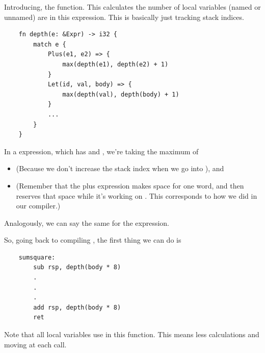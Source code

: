 \bigskip 

Introducing, the  function. This calculates the number of local variables (named or unnamed) are in this expression. This is basically just tracking stack indices. 
\begin{verbatim}
    fn depth(e: &Expr) -> i32 {
        match e {
            Plus(e1, e2) => {
                max(depth(e1), depth(e2) + 1)
            }
            Let(id, val, body) => {
                max(depth(val), depth(body) + 1)
            }
            ...
        }
    }\end{verbatim}
In a  expression, which has  and , we're taking the maximum of 
\begin{itemize}
    \item {} (Because we don't increase the stack index when we go into ), and 
    \item {} (Remember that the plus expression makes space for one word, and then reserves that space while it's working on . This corresponds to how we did  in our compiler.)
\end{itemize}
Analogously, we can say the same for the  expression. 

\bigskip 

So, going back to compiling , the first thing we can do is 
\begin{verbatim}
    sumsquare:
        sub rsp, depth(body * 8)
        . 
        . 
        .
        add rsp, depth(body * 8)
        ret\end{verbatim}
Note that all local variables use \code{[rsp + \_\_\_]} in this function. This means less calculations and moving  at each call.